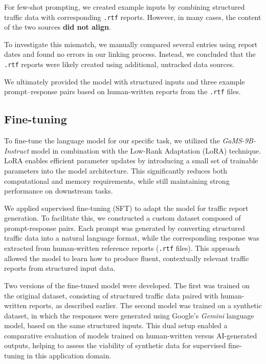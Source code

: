 \documentclass[fleqn,moreauthors,10pt]{ds_report}
\begin{document}

For few-shot prompting, we created example inputs by combining structured traffic data with corresponding \texttt{.rtf} reports. However, in many cases, the content of the two sources \textbf{did not align}.

To investigate this mismatch, we manually compared several entries using report dates and found no errors in our linking process. Instead, we concluded that the \texttt{.rtf} reports were likely created using additional, untracked data sources.

We ultimately provided the model with structured inputs and three example prompt–response pairs based on human-written reports from the \texttt{.rtf} files.


\subsection*{Fine-tuning}

To fine-tune the language model for our specific task, we utilized the \textit{GaMS-9B-Instruct} model in combination with the Low-Rank Adaptation (LoRA) technique. LoRA enables efficient parameter updates by introducing a small set of trainable parameters into the model architecture. This significantly reduces both computational and memory requirements, while still maintaining strong performance on downstream tasks.

We applied supervised fine-tuning (SFT) to adapt the model for traffic report generation. To facilitate this, we constructed a custom dataset composed of prompt-response pairs. Each prompt was generated by converting structured traffic data into a natural language format, while the corresponding response was extracted from human-written reference reports (\texttt{.rtf} files). This approach allowed the model to learn how to produce fluent, contextually relevant traffic reports from structured input data.

Two versions of the fine-tuned model were developed. The first was trained on the original dataset, consisting of structured traffic data paired with human-written reports, as described earlier. The second model was trained on a synthetic dataset, in which the responses were generated using Google's \textit{Gemini} language model, based on the same structured inputs. This dual setup enabled a comparative evaluation of models trained on human-written versus AI-generated outputs, helping to assess the viability of synthetic data for supervised fine-tuning in this application domain.
\end{document}
